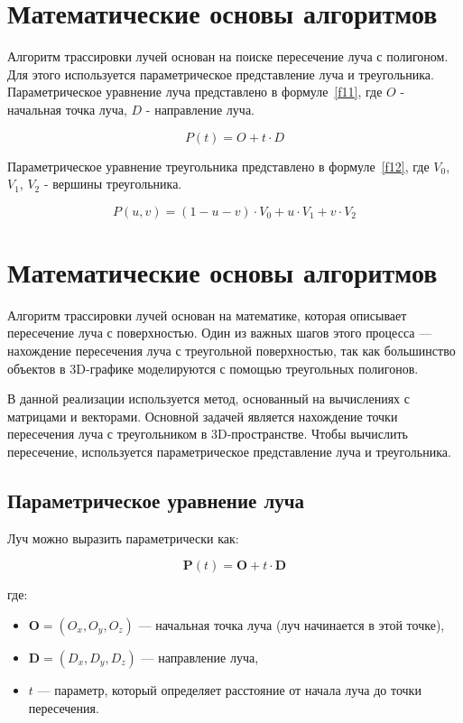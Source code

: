 
\section{Математические основы алгоритмов}
Алгоритм трассировки лучей основан на поиске пересечение луча с полигоном. Для этого используется параметрическое представление луча и треугольника.
Параметрическое уравнение луча представлено в формуле~\ref{f11}, где $O$ - начальная точка луча, $D$ - направление луча.

\begin{equation}
P(t) = O + t \cdot D
\label{f11}
\end{equation}

Параметрическое уравнение треугольника представлено в формуле~\ref{f12}, где $V_{0}$, $V_{1}$, $V_{2}$  - вершины треугольника.

\begin{equation}
P(u, v) = (1 - u - v) \cdot V_{0} + u \cdot V_{1} + v \cdot V_{2}
\label{f12}
\end{equation}

\section{Математические основы алгоритмов}

Алгоритм трассировки лучей основан на математике, которая описывает пересечение луча с поверхностью. Один из важных шагов этого процесса — нахождение пересечения луча с треугольной поверхностью, так как большинство объектов в 3D-графике моделируются с помощью треугольных полигонов.

В данной реализации используется метод, основанный на вычислениях с матрицами и векторами. Основной задачей является нахождение точки пересечения луча с треугольником в 3D-пространстве. Чтобы вычислить пересечение, используется параметрическое представление луча и треугольника.

\subsection{Параметрическое уравнение луча}

Луч можно выразить параметрически как:

\begin{equation}
\mathbf{P}(t) = \mathbf{O} + t \cdot \mathbf{D}
\end{equation}

где:
\begin{itemize}
    \item \(\mathbf{O} = (O_x, O_y, O_z)\) — начальная точка луча (луч начинается в этой точке),
    \item \(\mathbf{D} = (D_x, D_y, D_z)\) — направление луча,
    \item \(t\) — параметр, который определяет расстояние от начала луча до точки пересечения.
\end{itemize}

